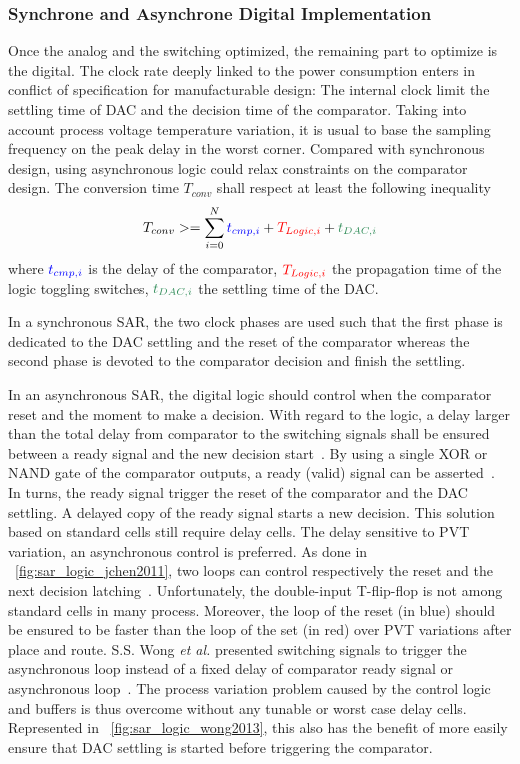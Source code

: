 \subsubsection{Synchrone and Asynchrone Digital Implementation}
Once the analog and the switching optimized, the remaining part to optimize is the digital. The clock rate deeply linked to the power consumption enters in conflict of specification for manufacturable design: The internal clock limit the settling time of DAC and the decision time of the comparator. Taking into account process voltage temperature variation, it is usual to base the sampling frequency on the peak delay in the worst corner. Compared with synchronous design, using asynchronous logic could relax constraints on the comparator design. The conversion time \(T_{conv}  \) shall respect at least the following inequality
\begin{equation}
\label{eqn:sar_async_conv}
T_{conv} >= \sum_{i=0}^N {\textcolor{blue}{t_{cmp, i}}+\textcolor{red}{T_{Logic, i}}+\textcolor{Xgreen}{t_{DAC, i}}}
\end{equation}
where \(\textcolor{blue}{t_{cmp, i}}\) is the delay of the comparator, \(\textcolor{red}{T_{Logic, i}}\) the propagation time of the logic toggling switches, \(\textcolor{Xgreen}{t_{DAC, i}}\) the settling time of the DAC\@.

In a synchronous SAR, the two clock phases are used such that the first phase is dedicated to the DAC settling and the reset of the comparator whereas the second phase is devoted to the comparator decision and finish the settling.

In an asynchronous SAR, the digital logic should control when the comparator reset and the moment to make a decision. With regard to the logic, a delay larger than the total delay from comparator to the switching signals shall be ensured between a ready signal and the new decision start~\cite{Brenna2014}. By using a single XOR or NAND gate of the comparator outputs, a ready (valid) signal can be asserted~\cite{Brenna2014, Sekimoto2011, Zhu2015,Shen2018}. In turns, the ready signal trigger the reset of the comparator and the DAC settling. A delayed copy of the ready signal starts a new decision. This solution based on standard cells still require delay cells. The delay sensitive to PVT variation, an asynchronous control is preferred. As done in \figurename~\ref{fig:sar_logic_jchen2011}, two loops can control respectively the reset and the next decision latching~\cite{JChen2011}. Unfortunately, the double-input T-flip-flop is not among standard cells in many process. Moreover, the loop of the reset (in blue) should be ensured to be faster than the loop of the set (in red) over PVT variations after place and route. S.S. Wong \textit{et al.} presented switching signals to trigger the asynchronous loop instead of a fixed delay of comparator ready signal or asynchronous loop~\cite{Wong2013}. The process variation problem caused by the control logic and buffers is thus overcome without any tunable or worst case delay cells. Represented in \figurename~\ref{fig:sar_logic_wong2013}, this also has the benefit of more easily ensure that DAC settling is started before triggering the comparator.

